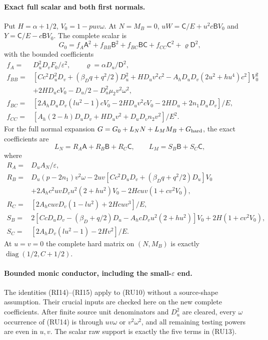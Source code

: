 \paragraph{Exact full scalar and both first normals.}
Put $H=\alpha+1/2$, $V_0=1-puv\omega$. At $N=M_B=0$,
$uW=\mathsf C/E+u^2c\mathsf BV_0$ and
$Y=\mathsf C/E-c\mathsf BV_0$. The complete scalar is
\[
 G_0=f_A\mathsf A^2+f_{BB}\mathsf B^2+
       f_{BC}\mathsf B\mathsf C+f_{CC}\mathsf C^2+
       \varrho\mathsf D^2,                                      \tag{RU13}
\]
with the bounded coefficients
\[
\begin{aligned}
 f_A={}&D_u^2D_vF_0/\varepsilon^2,\qquad
 \varrho=\alpha D_u/\mathsf D^2,\\
 f_{BB}={}&[Cc^2D_u^2D_v+(\beta_Dq+q^2/2)D_u^2+HD_uv^2c^2
             -A_hD_uD_v(2u^2+hu^4)c^2]V_0^2\\
          &+2HD_ucV_0-D_u/2-D_u^2\mu_2v^2\omega^2,\\
 f_{BC}={}&[2A_hD_uD_v(lu^2-1)cV_0-2HD_uv^2cV_0
                   -2HD_u+2n_1D_uD_v]/E,\\
 f_{CC}={}&[A_h(2-h)D_uD_v+HD_uv^2+D_uD_vn_2v^2]/E^2.
\end{aligned}                                                     \tag{RU14}
\]
For the full normal expansion
$G=G_0+L_NN+L_MM_B+G_{\rm hard}$, the exact coefficients are
\[
 L_N=R_A\mathsf A+R_B\mathsf B+R_C\mathsf C,
 \qquad L_M=S_B\mathsf B+S_C\mathsf C,                           \tag{RU15}
\]
where
\[
\begin{aligned}
 R_A={}&D_uA_N/\varepsilon,\\
 R_B={}&D_u(p-2n_1)v^2\omega
 -2uv[Cc^2D_uD_v+(\beta_Dq+q^2/2)D_u]V_0\\
 &+2A_hc^2uvD_vu^2(2+hu^2)V_0-2Hcuv(1+cv^2V_0),\\
 R_C={}&[2A_hcuvD_v(1-lu^2)+2Hcuv^3]/E,\\
 S_B={}&2[CcD_uD_v-(\beta_D+q/2)D_u
                      -A_hcD_vu^2(2+hu^2)]V_0
                         +2H(1+cv^2V_0),\\
 S_C={}&[2A_hD_v(lu^2-1)-2Hv^2]/E.
\end{aligned}                                                     \tag{RU16}
\]
At $u=v=0$ the complete hard matrix on $(N,M_B)$ is exactly
$\operatorname{diag}(1/2,C+1/2)$.

\paragraph{Bounded monic conductor, including the small-$\varepsilon$ end.}
The identities (RI14)--(RI15) apply to (RU10) without a source-shape
assumption. Their crucial inputs are checked here on the new complete
coefficients. After finite source unit denominators and $D_u^2$ are
cleared, every $\omega$ occurrence of (RU14) is through $uv\omega$
or $v^2\omega^2$, and all remaining testing powers are even in $u,v$.
The scalar raw support is exactly the five terms in (RU13).

